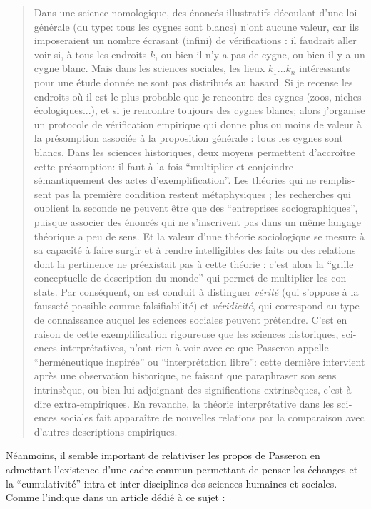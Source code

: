 \foreignblockquote{english}[\cite{Allard2000}]{Dans une science nomologique, des énoncés illustratifs découlant d’une loi générale (du type: tous les cygnes sont blancs) n’ont aucune valeur, car ils imposeraient un nombre écrasant (infini) de vérifications : il faudrait aller voir si, à tous les endroits $k$, ou bien il n’y a pas de cygne, ou bien il y a un cygne blanc. Mais dans les sciences sociales, les lieux $k_1 ... k_n$ intéressants pour une étude donnée ne sont pas distribués au hasard. Si je recense les endroits où il est le plus probable que je rencontre des cygnes (zoos, niches écologiques...), et si je rencontre toujours des cygnes blancs; alors j’organise un protocole de vérification empirique qui donne plus ou moins de valeur à la présomption associée à la proposition générale : tous les cygnes sont blancs. Dans les sciences historiques, deux moyens permettent d’accroître cette présomption: il faut à la fois \enquote{multiplier et conjoindre sémantiquement des actes d’exemplification}. Les théories qui ne remplissent pas la première condition restent métaphysiques ; les recherches qui oublient la seconde ne peuvent être que des \enquote{entreprises sociographiques}, puisque associer des énoncés qui ne s’inscrivent pas dans un même langage théorique a peu de sens. Et la valeur d’une théorie sociologique se mesure à sa capacité à faire surgir et à rendre intelligibles des faits ou des relations dont la pertinence ne préexistait pas à cette théorie : c’est alors la \enquote{grille conceptuelle de description du monde} qui permet de multiplier les constats. Par conséquent, on est conduit à distinguer \textit{vérité} (qui s’oppose à la fausseté possible comme falsifiabilité) et \textit{véridicité}, qui correspond au type de connaissance auquel les sciences sociales peuvent prétendre. C’est en raison de cette exemplification rigoureuse que les sciences historiques, sciences interprétatives, n’ont rien à voir avec ce que Passeron appelle \enquote{herméneutique inspirée} ou \enquote{interprétation libre}: cette dernière intervient après une observation historique, ne faisant que paraphraser son sens intrinsèque, ou bien lui adjoignant des significations extrinsèques, c’est-à-dire extra-empiriques. En revanche, la théorie interprétative dans les sciences sociales fait apparaître de nouvelles relations par la comparaison avec d’autres descriptions empiriques.}

Néanmoins, il semble important de relativiser les propos de Passeron en admettant l'existence d'une cadre commun permettant de penser les échanges et la \enquote{cumulativité}  intra et inter disciplines des sciences humaines et sociales. Comme l'indique \textcite{Pumain2005} dans un article dédié à ce sujet :

